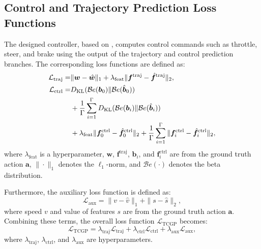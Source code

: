 \subsection{Control and Trajectory Prediction Loss Functions}
The designed controller, based on \cite{Wu_2022_TgC}, computes control commands such as throttle, steer, and brake using the output of the trajectory and control prediction branches. The corresponding loss functions are defined as:
\begin{align}
    \mathcal{L}_{\text{traj}} =& \|\bm{w} - \hat{\bm{w}}\|_1 + \lambda_{\text{feat}}\|\bm{f}^{\text{traj}} - \hat{\bm{f}}^{\text{traj}}\|_2, \\
    \mathcal{L}_{\text{ctrl}}
    =& D_{\text{KL}}(\mathcal{B}e(\bm{b}_{0})\|\mathcal{B}e(\hat{\bm{b}}_{0}))  \notag\\
    &+\frac{1}{\Gamma}\sum_{i=1}^{\Gamma}D_{\text{KL}}(\mathcal{B}e(\bm{b}_{i})\|\mathcal{B}e(\hat{\bm{b}}_{i})) \notag\\
    & + \lambda_{\text{feat}}\|\bm{f}^{\text{ctrl}}_{0} - \hat{\bm{f}}^{\text{ctrl}}_{0}\|_{2}
    + \frac{1}{\Gamma}\sum_{i=1}^{\Gamma}\|\bm{f}^{\text{ctrl}}_{i} - \hat{\bm{f}}^{\text{ctrl}}_{i}\|_{2},
\end{align}
where $\lambda_\text{feat}$ is a hyperparameter, $\bm{w}$, $\bm{f}^{\text{traj}}$, $\bm{b}_{i}$, and $\bm{f}_{i}^{\text{ctrl}}$ are from the ground truth action $\bm{a}$, $\|\cdot\|_{1}$ denotes the $\ell_{1}$-norm, and $\mathcal{B}e(\cdot)$ denotes the beta distribution.

Furthermore, the auxiliary loss function is defined as:
\begin{equation}
    \mathcal{L}_{\text{aux}} = \|v-\hat{v}\|_{1} + \|s-\hat{s}\|_{2},
\end{equation}
where speed $v$ and value of features $s$ are from the ground truth action $\bm{a}$. Combining these terms, the overall loss function $\mathcal{L}_{\text{TCGP}}$ becomes:
\begin{equation}
    \mathcal{L}_{\text{TCGP}} = \lambda_{\text{traj}}\mathcal{L}_{\text{traj}} + \lambda_{\text{ctrl}}\mathcal{L}_{\text{ctrl}} + \lambda_{\text{aux}}\mathcal{L}_{\text{aux}},
\end{equation}
where $\lambda_{\text{traj}}$, $\lambda_{\text{ctrl}}$, and $\lambda_{\text{aux}}$ are hyperparameters.

